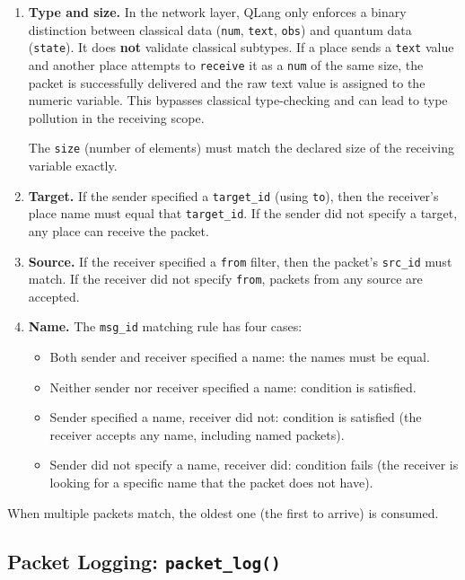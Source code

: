 \begin{enumerate}
    \item \textbf{Type and size.} In the network layer, QLang only enforces a binary distinction between classical data (\texttt{num}, \texttt{text}, \texttt{obs}) and quantum data (\texttt{state}). It does \textbf{not} validate classical subtypes. If a place sends a \texttt{text} value and another place attempts to \texttt{receive} it as a \texttt{num} of the same size, the packet is successfully delivered and the raw text value is assigned to the numeric variable. This bypasses classical type-checking and can lead to type pollution in the receiving scope.
    
    The \texttt{size} (number of elements) must match the declared size of the receiving variable exactly.
    \item \textbf{Target.} If the sender specified a \texttt{target\_id} (using
        \texttt{to}), then the receiver's place name must equal that
        \texttt{target\_id}. If the sender did not specify a target, any place
        can receive the packet.
    \item \textbf{Source.} If the receiver specified a \texttt{from} filter,
        then the packet's \texttt{src\_id} must match. If the receiver did
        not specify \texttt{from}, packets from any source are accepted.
    \item \textbf{Name.} The \texttt{msg\_id} matching rule has four cases:
    \begin{itemize}
        \item Both sender and receiver specified a name: the names must be
            equal.
        \item Neither sender nor receiver specified a name: condition is
            satisfied.
        \item Sender specified a name, receiver did not: condition is
            satisfied (the receiver accepts any name, including named packets).
        \item Sender did not specify a name, receiver did: condition
            fails (the receiver is looking for a specific name that
            the packet does not have).
    \end{itemize}
\end{enumerate}

When multiple packets match, the oldest one (the first to arrive) is consumed.

\subsection{Packet Logging: \texttt{packet\_log()}}
\label{sec:packet-log}

